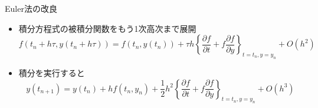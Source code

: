 \begin{frame}[t,fragile]{Euler法の改良}
  \begin{itemize}
  \item 積分方程式の被積分関数をもう1次高次まで展開
    \[
    f(t_n+h\tau, y(t_n+h\tau)) = f(t_n, y(t_n)) +
    \tau h
    \left\{
    \frac{\partial f}{\partial t}
    + f \frac{\partial f}{\partial y}
    \right\}_{t=t_n, y=y_n}
    \!\!\!\!\!\!\!\!\!\!\!\! + O(h^2)
    \]
  \item 積分を実行すると
    \[
    y(t_{n+1}) = y(t_n) + h f(t_n, y_n) + \frac{1}{2}h^2
    \left\{
    \frac{\partial f}{\partial t}
    + f \frac{\partial f}{\partial y}
    \right\}_{t=t_n, y=y_n}
    \!\!\!\!\!\!\!\!\!\!\!\! + O(h^3)
    \]
  \end{itemize}
\end{frame}
